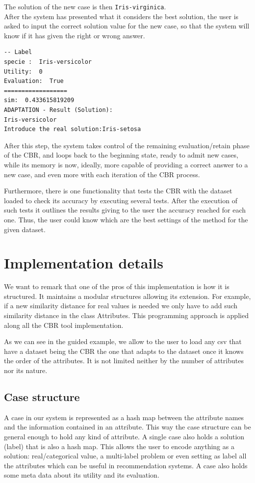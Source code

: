\documentclass[11pt]{article}
\begin{document}
The solution of the new case is then \texttt{Iris-virginica}.
\\

After the system has presented what it considers the best solution, the user is asked to input the correct solution value for the new case, so that the system will know if it has given the right or wrong answer.
\begin{verbatim}
-- Label
specie :  Iris-versicolor
Utility:  0
Evaluation:  True
==================
sim:  0.433615819209
ADAPTATION - Result (Solution):
Iris-versicolor
Introduce the real solution:Iris-setosa
\end{verbatim}


After this step, the system takes control of the remaining evaluation/retain phase of the CBR, and loops back to the beginning state, ready to admit new cases, while its memory is now, ideally, more capable of providing a correct answer to a new case, and even more with each iteration of the CBR process.

Furthermore, there is one functionality that tests the CBR with the dataset loaded to check its accuracy by executing several tests. After the execution of such tests it outlines the results giving to the user the accuracy reached for each one. Thus, the user could know which are the best settings of the method for the given dataset.

\section{Implementation details}

We want to remark that one of the pros of this implementation is how it is structured. It maintains a modular structures allowing its extension. For example, if a new similarity distance for real values is needed we only have to add such similarity distance in the class Attributes. This programming approach is applied along all the CBR tool implementation.

As we can see in the guided example, we allow to the user to load any csv that have a dataset being the CBR the one that adapts to the dataset once it knows the order of the attributes. It is not limited neither by the number of attributes nor its nature.

\subsection{Case structure}

A case in our system is represented as a hash map between the attribute names and the information contained in an attribute. This way the case structure can be general enough to hold any kind of attribute. A single case also holds a solution (label) that is also a hash map. This allows the user to encode anything as a solution: real/categorical value, a multi-label problem or even setting as label all the attributes which can be useful in recommendation systems. A case also holds some meta data about its utility and its evaluation.
\end{document}
